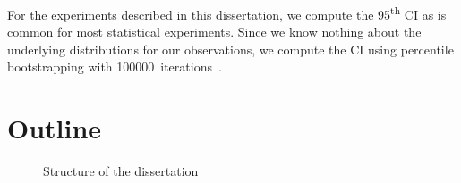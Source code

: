 For the experiments described in this dissertation, we compute the
\num{95}\textsuperscript{th} \gls{CI} as is common for most statistical
experiments.
%
Since we know nothing about the underlying distributions for our observations,
we compute the \gls{CI} using \gls{percentile bootstrapping} with
\num{100000}~iterations~\cite{EfronTibshirani:1994}.


\section{Outline}

\begin{figure}
  \centering%
  

  \caption{Structure of the dissertation}
\end{figure}

